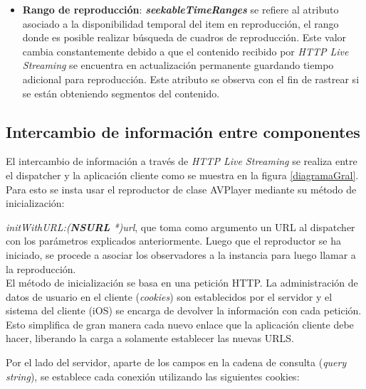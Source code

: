 \begin{itemize}
\item \textbf{Rango de reproducción}: \textit{\textbf{seekableTimeRanges}} se refiere al atributo asociado a la disponibilidad temporal del item en reproducción, el rango donde es posible realizar búsqueda de cuadros de reproducción. Este valor cambia constantemente debido a que el contenido recibido por \textit{HTTP Live Streaming} se encuentra en actualización permanente guardando tiempo adicional para reproducción. Este atributo se observa con el fin de rastrear si se están obteniendo segmentos del contenido.
\end{itemize}
\label{item:seekableTimeRanges}
\label{item:kvo-tracks}
		
\subsection{Intercambio de información entre componentes}
\label{subsec:cookies}

El intercambio de información a través de \textit{HTTP Live Streaming} se realiza entre el dispatcher y la aplicación cliente como se muestra en la figura \ref{diagramaGral}. Para esto se insta usar el reproductor de clase AVPlayer mediante su método de inicialización:

\textit{initWithURL:(\textbf{NSURL} *)url}, que toma como argumento un URL al dispatcher con los parámetros explicados anteriormente. Luego que el reproductor se ha iniciado, se procede a asociar los observadores a la instancia para luego llamar a la reproducción.\\

El método de inicialización se basa en una petición HTTP. La administración de datos de usuario en el cliente (\textit{cookies}) son establecidos por el servidor y el sistema del cliente (iOS) se encarga de devolver la información con cada petición. Esto simplifica de gran manera cada nuevo enlace que la aplicación cliente debe hacer, liberando la carga a solamente establecer las nuevas URLS.

Por el lado del servidor, aparte de los campos en la cadena de consulta (\textit{query string}), se establece cada conexión utilizando las siguientes cookies:


